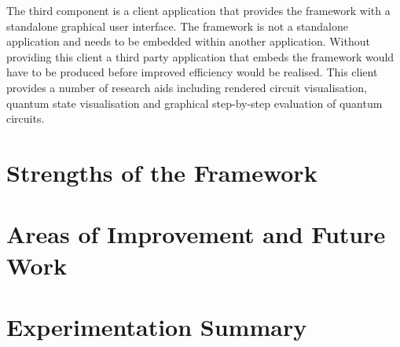 The third component is a client application that provides the framework with a standalone graphical user interface.
The framework is not a standalone application and needs to be embedded within another application.
Without providing this client a third party application that embeds the framework would have to be produced before improved efficiency would be realised.
This client provides a number of research aids including rendered circuit visualisation, quantum state visualisation and graphical step-by-step evaluation of quantum circuits.



% 


\section{Strengths of the Framework}

\section{Areas of Improvement and Future Work}

\section{Experimentation Summary}